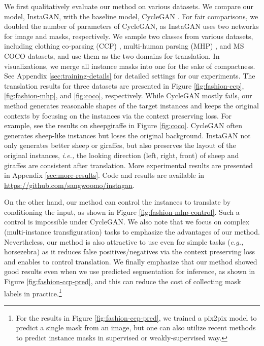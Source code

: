 \documentclass{article} \usepackage{iclr2019_conference,times}
\begin{document}
We first qualitatively evaluate our method on various datasets.
We compare our model, InstaGAN, with the baseline model, CycleGAN \citep{zhu2017unpaired}.
For fair comparisons, we doubled the number of parameters of CycleGAN, as InstaGAN uses two networks for image and masks, respectively.
We sample two classes from various datasets, including clothing co-parsing (CCP) \citep{yang2014clothing},
multi-human parsing (MHP) \citep{zhao2018understanding}, and MS COCO \citep{lin2014microsoft} datasets,
and use them as the two domains for translation.
In visualizations, we merge all instance masks into one for the sake of compactness.
See Appendix \ref{sec:training-details} for detailed settings for our experiments.
The translation results for three datasets are presented in Figure \ref{fig:fashion-ccp}, \ref{fig:fashion-mhp}, and \ref{fig:coco}, respectively.
While CycleGAN mostly fails, our method generates reasonable shapes of the target instances and keeps the original contexts by focusing on the
instances via the context preserving loss.
For example, see the results on sheepgiraffe in Figure \ref{fig:coco}.
CycleGAN often generates sheep-like instances but loses the original background.
InstaGAN  not only generates better sheep or giraffes, but also preserves the layout of the original instances,
\textit{i.e.,} the looking direction (left, right, front) of sheep and giraffes are consistent after translation.
More experimental results are presented in Appendix \ref{sec:more-results}.
Code and results are available in \url{https://github.com/sangwoomo/instagan}.



On the other hand, our method can control the instances to translate by conditioning the input, as shown in Figure \ref{fig:fashion-mhp-control}.
Such a control is impossible under
CycleGAN. We also note that we focus on complex (multi-instance transfiguration) tasks to emphasize the advantages of our method.
Nevertheless, our method is also attractive to use even for simple tasks (\textit{e.g.,} horsezebra)
as it reduces false positives/negatives via the context preserving loss and enables to control translation.
We finally emphasize that our method showed good results even when we use predicted segmentation for inference,
as shown in Figure \ref{fig:fashion-ccp-pred}, and this can reduce the cost of collecting mask labels in practice.\footnote{
For the results in Figure \ref{fig:fashion-ccp-pred}, we trained a pix2pix \citep{isola2017image} model to predict a single mask from an image,
but one can also utilize recent methods to predict instance masks
in supervised \citep{he2017mask} or weakly-supervised \citep{zhou2018weakly} way.}
\end{document}
